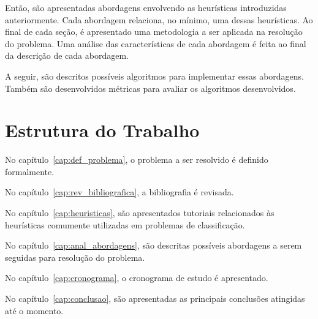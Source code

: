 Então, são apresentadas abordagens envolvendo as heurísticas introduzidas
anteriormente. Cada abordagem relaciona, no mínimo, uma dessas heurísticas.
Ao final de cada seção, é apresentado uma metodologia a ser aplicada
na resolução do problema. Uma análise das características de cada abordagem
é feita ao final da descrição de cada abordagem.

A seguir, são descritos possíveis algoritmos para implementar essas abordagens. Também são
desenvolvidos métricas para avaliar os algoritmos desenvolvidos.


\section{Estrutura do Trabalho}

No capítulo~\ref{cap:def_problema}, o problema a ser resolvido é definido formalmente.

No capítulo~\ref{cap:rev_bibliografica}, a bibliografia é revisada.

No capítulo~\ref{cap:heuristicas}, são apresentados tutoriais relacionados às
heurísticas comumente utilizadas em problemas de classificação.

No capítulo~\ref{cap:anal_abordagens}, são descritas possíveis abordagens a serem
seguidas para resolução do problema.

No capítulo~\ref{cap:cronograma}, o cronograma de estudo é apresentado.

No capítulo~\ref{cap:conclusao}, são apresentadas as principais conclusões atingidas
até o momento.
